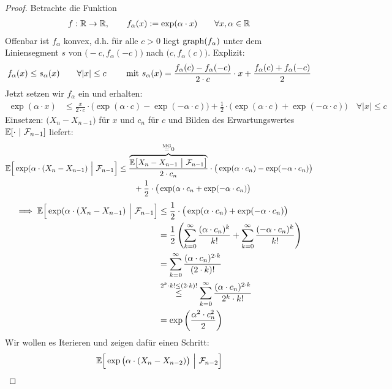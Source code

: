 \begin{proof}
	Betrachte die Funktion
	\begin{align*}
		f:\R\to\R,\qquad f_\alpha(x):=\exp(\alpha\cdot x)\qquad\forall x,\alpha\in\R
	\end{align*}
	Offenbar ist $f_\alpha$ konvex, d.h. für alle $c>0$ liegt $\graph(f_\alpha)$ unter dem Liniensegment $s$ von $\big(-c,f_\alpha(-c)\big)$ nach $\big(c,f_\alpha(c)\big)$. Explizit:
	\begin{align*}
		f_\alpha(x)\leq s_\alpha(x)\qquad\forall |x|\leq c\qquad\mit s_\alpha(x)=\frac{f_\alpha(c)-f_\alpha(-c)}{2\cdot c}\cdot x+\frac{f_\alpha(c)+f_\alpha(-c)}{2}
	\end{align*}
	Jetzt setzen wir $f_\alpha$ ein und erhalten:
	\begin{align*}
		\exp(\alpha\cdot x)
		&\leq\frac{x}{2\cdot c}\cdot\big(\exp(\alpha\cdot c)-\exp(-\alpha\cdot c)\big)+\frac{1}{2}\cdot\big(\exp(\alpha\cdot c)+\exp(-\alpha\cdot c)\big)\quad\forall |x|\leq c
	\end{align*}
	Einsetzen: $\big(X_n-X_{n-1}\big)$ für $x$ und $c_n$ für $c$ und Bilden des Erwartungswertes $\E[\cdot~|~\F_{n-1}]$ liefert:
	\begin{align*}
		\E\Big[\exp(\alpha\cdot(X_n-X_{n-1})~\Big|~\F_{n-1}\Big]
		&\leq
		\frac{\overbrace{\E\big[X_n-X_{n-1}~\big|~\F_{n-1}\big]}^{\stackeq{\text{MG}}0}}{2\cdot c_n}\cdot\big(\exp(\alpha\cdot c_n)-\exp(-\alpha\cdot c_n)\big)\\
		&\qquad+\frac{1}{2}\cdot\big(\exp(\alpha\cdot c_n+\exp(-\alpha\cdot c_n)\big)
	\end{align*}
	\begin{align*}
		\implies
		\E\Big[\exp(\alpha\cdot(X_n-X_{n-1})~\Big|~\F_{n-1}\Big]
		&\leq \frac{1}{2}\cdot\big(\exp(\alpha\cdot c_n)+\exp(-\alpha\cdot c_n)\big)\\
		&=\frac{1}{2}\left(\sum\limits_{k=0}^\infty\frac{(\alpha\cdot c_n)^{k}}{k!}+\sum\limits_{k=0}^\infty\frac{(-\alpha\cdot c_n)^{k}}{k!}\right)\\
		&=\sum\limits_{k=0}^\infty\frac{(\alpha\cdot c_n)^{2\cdot k}}{(2\cdot k)!}\\
		&\stackrel{2^k\cdot k! \leq (2\cdot k)!}{\leq}\sum\limits_{k=0}^\infty\frac{(\alpha\cdot c_n)^{2\cdot k}}{2^k\cdot k!}\\
		&=\exp\left(\frac{\alpha^2\cdot c_n^2}{2}\right)
	\end{align*}
	Wir wollen es Iterieren und zeigen dafür einen Schritt:
	\begin{align*}
		&\E\Big[\exp\big(\alpha\cdot(X_n-X_{n-2})\big)~\Big|~\F_{n-2}\Big]\\

\end{align*}
\end{proof}
